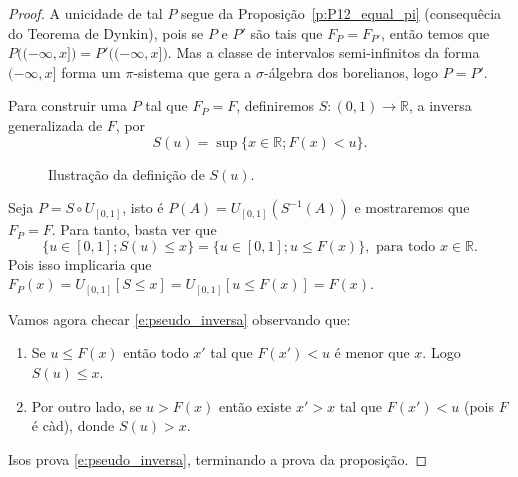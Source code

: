 \documentclass[reqno, final]{book}
\newcommand*\1{\mathds{1}}
\begin{document}
\begin{proof}
  A unicidade de tal $P$ segue da Proposição~\ref{p:P12_equal_pi} (consequêcia do Teorema de Dynkin), pois se $P$ e $P'$ são tais que $F_{P} = F_{P'}$, então temos que $P\big( (-\infty, x] \big) = P'\big( (-\infty, x] \big)$.
  Mas a classe de intervalos semi-infinitos da forma $(-\infty, x]$ forma um $\pi$-sistema que gera a $\sigma$-álgebra dos borelianos, logo $P = P'$.

  Para construir uma $P$ tal que $F_P = F$, definiremos $S:(0,1) \to \mathbb{R}$, a inversa generalizada de $F$, por
  \begin{equation}
    S(u) = \sup \{x \in \mathbb{R}; F(x) < u\}.
  \end{equation}
  \begin{figure}[htbp]
    \centering
    \caption{\small Ilustração da definição de $S(u)$.}
    \label{f:Rk_good}
  \end{figure}

  Seja $P = S \circ U_{[0,1]}$, isto é $P(A) = U_{[0,1]}(S^{-1}(A))$ e mostraremos que $F_P = F$.
  Para tanto, basta ver que
  \begin{equation}
    \label{e:pseudo_inversa}
    \{u \in [0,1]; S(u) \leq x\} = \{u \in [0,1]; u \leq F(x)\}, \text{ para todo $x \in \mathbb{R}$}.
  \end{equation}
  Pois isso implicaria que $F_P(x) = U_{[0,1]}[S \leq x] = U_{[0,1]} [u \leq F(x)] = F(x)$.

  Vamos agora checar \eqref{e:pseudo_inversa} observando que:
  \begin{enumerate}[\quad a)]
  \item Se $u \leq F(x)$ então todo $x'$ tal que $F(x') < u$ é menor que $x$.
    Logo $S(u) \leq x$.
  \item Por outro lado, se $u > F(x)$ então existe $x' > x$ tal que $F(x') < u$ (pois $F$ é càd), donde $S(u) > x$.
  \end{enumerate}
  Isos prova \eqref{e:pseudo_inversa}, terminando a prova da proposição.
\end{proof}
\end{document}
